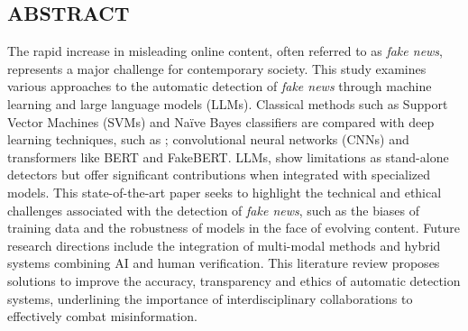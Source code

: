 \documentclass[a4paper,12pt, twocolumn]{article}
\begin{document}
\begin{onecolumn}
\section*{ABSTRACT}
\label{chap:abstract}
The rapid increase in misleading online content, often referred to as \textit{fake news}, represents a major challenge for contemporary society. This study examines various approaches to the automatic detection of \textit{fake news} through machine learning and large language models (LLMs). Classical methods such as Support Vector Machines (SVMs) and Naïve Bayes classifiers are compared with deep learning techniques, such as ; convolutional neural networks (CNNs) and transformers like BERT and FakeBERT. LLMs, show limitations as stand-alone detectors but offer significant contributions when integrated with specialized models. This state-of-the-art paper seeks to highlight the technical and ethical challenges associated with the detection of \textit{fake news}, such as the biases of training data and the robustness of models in the face of evolving content. Future research directions include the integration of multi-modal methods and hybrid systems combining AI and human verification. This literature review proposes solutions to improve the accuracy, transparency and ethics of automatic detection systems, underlining the importance of interdisciplinary collaborations to effectively combat misinformation.
\end{onecolumn}
\end{document}
